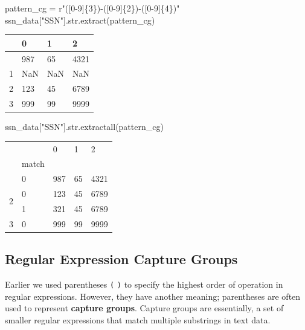 \documentclass[
  letterpaper,
  DIV=11,
  numbers=noendperiod]{scrreprt}
\newenvironment{Shaded}{\begin{snugshade}}{\end{snugshade}}
\newcommand{\BuiltInTok}[1]{\textcolor[rgb]{0.00,0.23,0.31}{#1}}
\newcommand{\NormalTok}[1]{\textcolor[rgb]{0.00,0.23,0.31}{#1}}
\newcommand{\OperatorTok}[1]{\textcolor[rgb]{0.37,0.37,0.37}{#1}}
\newcommand{\SpecialCharTok}[1]{\textcolor[rgb]{0.37,0.37,0.37}{#1}}
\newcommand{\StringTok}[1]{\textcolor[rgb]{0.13,0.47,0.30}{#1}}
\newcommand{\VerbatimStringTok}[1]{\textcolor[rgb]{0.13,0.47,0.30}{#1}}
\begin{document}
\begin{Shaded}
\begin{Highlighting}[]
\NormalTok{pattern\_cg }\OperatorTok{=} \VerbatimStringTok{r"([0{-}9]}\SpecialCharTok{\{3\}}\VerbatimStringTok{){-}([0{-}9]}\SpecialCharTok{\{2\}}\VerbatimStringTok{){-}([0{-}9]}\SpecialCharTok{\{4\}}\VerbatimStringTok{)"}
\NormalTok{ssn\_data[}\StringTok{"SSN"}\NormalTok{].}\BuiltInTok{str}\NormalTok{.extract(pattern\_cg)}
\end{Highlighting}
\end{Shaded}

\begin{longtable}[]{@{}llll@{}}
\toprule\noalign{}
& 0 & 1 & 2 \\
\midrule\noalign{}
\endhead
\bottomrule\noalign{}
\endlastfoot
0 & 987 & 65 & 4321 \\
1 & NaN & NaN & NaN \\
2 & 123 & 45 & 6789 \\
3 & 999 & 99 & 9999 \\
\end{longtable}

\begin{Shaded}
\begin{Highlighting}[]
\NormalTok{ssn\_data[}\StringTok{"SSN"}\NormalTok{].}\BuiltInTok{str}\NormalTok{.extractall(pattern\_cg)}
\end{Highlighting}
\end{Shaded}

\begin{longtable}[]{@{}lllll@{}}
\toprule\noalign{}
& & 0 & 1 & 2 \\
& match & & & \\
\midrule\noalign{}
\endhead
\bottomrule\noalign{}
\endlastfoot
0 & 0 & 987 & 65 & 4321 \\
\multirow{2}{=}{2} & 0 & 123 & 45 & 6789 \\
& 1 & 321 & 45 & 6789 \\
3 & 0 & 999 & 99 & 9999 \\
\end{longtable}

\subsection{Regular Expression Capture
Groups}\label{regular-expression-capture-groups}

Earlier we used parentheses \texttt{(} \texttt{)} to specify the highest
order of operation in regular expressions. However, they have another
meaning; parentheses are often used to represent \textbf{capture
groups}. Capture groups are essentially, a set of smaller regular
expressions that match multiple substrings in text data.
\end{document}
